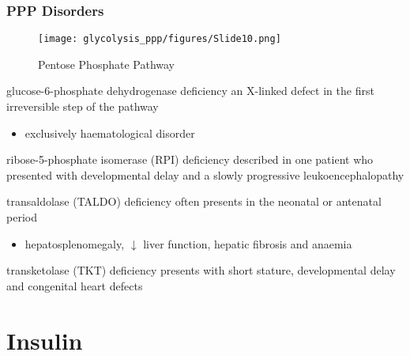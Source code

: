 \documentclass{scrartcl}
\begin{document}
\subsubsection{PPP Disorders}
\label{sec:orgd30eafb}
\begin{figure}[htbp]
\centering
\texttt{[image: glycolysis\_ppp/figures/Slide10.png]}
\caption{\label{fig:orga927cda}Pentose Phosphate Pathway}
\end{figure}

\begin{description}
\item{glucose-6-phosphate dehydrogenase deficiency} an X-linked defect
in the first irreversible step of the pathway
\begin{itemize}
\item exclusively haematological disorder
\end{itemize}
\item{ribose-5-phosphate isomerase (RPI) deficiency} described in one
patient who presented with developmental delay and a slowly
progressive leukoencephalopathy
\item{transaldolase (TALDO) deficiency} often presents in the neonatal
or antenatal period
\begin{itemize}
\item hepatosplenomegaly, \(\downarrow\) liver function, hepatic fibrosis
and anaemia
\end{itemize}
\item{transketolase (TKT) deficiency} presents with short stature,
developmental delay and congenital heart defects
\end{description}
\section{Insulin}
\label{sec:orgbe560d9}
\end{document}
